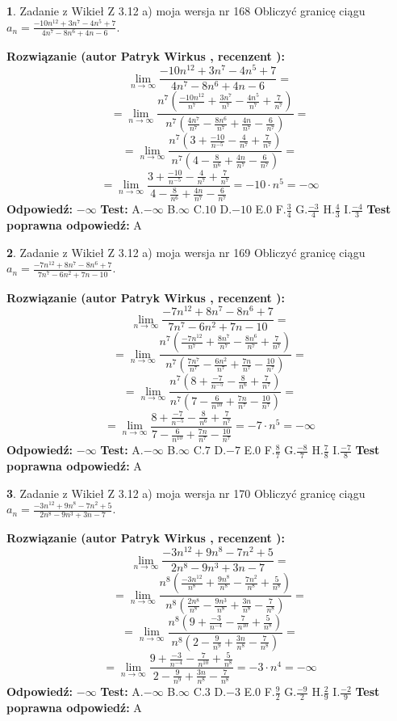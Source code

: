 \documentclass[12pt, a4paper]{article}
\theoremstyle{definition} %
\newtheorem{zad}{}
\newcommand{\zadStart}[1]{\begin{zad}#1\newline}
\newcommand{\zadStop}{\end{zad}}
\newcommand{\rozwStart}[2]{\noindent \textbf{Rozwiązanie (autor #1 , recenzent #2): }\newline}
\newcommand{\rozwStop}{\newline}
\newcommand{\odpStart}{\noindent \textbf{Odpowiedź:}\newline}
\newcommand{\odpStop}{\newline}
\newcommand{\testStart}{\noindent \textbf{Test:}\newline}
\newcommand{\testStop}{\newline}
\newcommand{\kluczStart}{\noindent \textbf{Test poprawna odpowiedź:}\newline}
\newcommand{\kluczStop}{\newline}
\begin{document}
\zadStart{Zadanie z Wikieł Z 3.12 a) moja wersja nr 168}
Obliczyć granicę ciągu $a_{n}=\frac{-10n^{12}+3n^{7}-4n^{5}+7}{4n^{7}-8n^{6}+4n-6}$.
\zadStop
\rozwStart{Patryk Wirkus}{}
$$\lim\limits_{n\to\infty}\frac{-10n^{12}+3n^{7}-4n^{5}+7}{4n^{7}-8n^{6}+4n-6}=$$
$$=\lim\limits_{n\to\infty}\frac{n^{7}\left(\frac{-10n^{12}}{n^{7}}+\frac{3n^{7}}{n^{7}}-\frac{4n^{5}}{n^{7}}+\frac{7}{n^{7}}\right)}{n^{7}\left(\frac{4n^{7}}{n^{7}}-\frac{8n^{6}}{n^{7}}+\frac{4n}{n^{7}}-\frac{6}{n^{7}}\right)}=$$
$$=\lim\limits_{n\to\infty}\frac{n^{7}\left(3+\frac{-10}{n^{-5}}-\frac{4}{n^{7}}+\frac{7}{n^{7}}\right)}
{n^{7}\left(4-\frac{8}{n^{6}}+\frac{4n}{n^{7}}-\frac{6}{n^{7}}\right)}=$$
$$=\lim\limits_{n\to\infty}\frac{3+\frac{-10}{n^{-5}}-\frac{4}{n^{7}}+\frac{7}{n^{7}}}{4-\frac{8}{n^{6}}+\frac{4n}{n^{7}}-\frac{6}{n^{7}}}=-10\cdot n^{5} = -\infty$$
\rozwStop
\odpStart
$-\infty$
\odpStop
\testStart
A.$-\infty$
B.$\infty$
C.$10$
D.$-10$
E.$0$
F.$\frac{3}{4}$
G.$\frac{-3}{4}$
H.$\frac{4}{3}$
I.$\frac{-4}{3}$
\testStop
\kluczStart
A
\kluczStop



\zadStart{Zadanie z Wikieł Z 3.12 a) moja wersja nr 169}
Obliczyć granicę ciągu $a_{n}=\frac{-7n^{12}+8n^{7}-8n^{6}+7}{7n^{7}-6n^{2}+7n-10}$.
\zadStop
\rozwStart{Patryk Wirkus}{}
$$\lim\limits_{n\to\infty}\frac{-7n^{12}+8n^{7}-8n^{6}+7}{7n^{7}-6n^{2}+7n-10}=$$
$$=\lim\limits_{n\to\infty}\frac{n^{7}\left(\frac{-7n^{12}}{n^{7}}+\frac{8n^{7}}{n^{7}}-\frac{8n^{6}}{n^{7}}+\frac{7}{n^{7}}\right)}{n^{7}\left(\frac{7n^{7}}{n^{7}}-\frac{6n^{2}}{n^{7}}+\frac{7n}{n^{7}}-\frac{10}{n^{7}}\right)}=$$
$$=\lim\limits_{n\to\infty}\frac{n^{7}\left(8+\frac{-7}{n^{-5}}-\frac{8}{n^{6}}+\frac{7}{n^{7}}\right)}
{n^{7}\left(7-\frac{6}{n^{10}}+\frac{7n}{n^{7}}-\frac{10}{n^{7}}\right)}=$$
$$=\lim\limits_{n\to\infty}\frac{8+\frac{-7}{n^{-5}}-\frac{8}{n^{6}}+\frac{7}{n^{7}}}{7-\frac{6}{n^{10}}+\frac{7n}{n^{7}}-\frac{10}{n^{7}}}=-7\cdot n^{5} = -\infty$$
\rozwStop
\odpStart
$-\infty$
\odpStop
\testStart
A.$-\infty$
B.$\infty$
C.$7$
D.$-7$
E.$0$
F.$\frac{8}{7}$
G.$\frac{-8}{7}$
H.$\frac{7}{8}$
I.$\frac{-7}{8}$
\testStop
\kluczStart
A
\kluczStop



\zadStart{Zadanie z Wikieł Z 3.12 a) moja wersja nr 170}
Obliczyć granicę ciągu $a_{n}=\frac{-3n^{12}+9n^{8}-7n^{2}+5}{2n^{8}-9n^{3}+3n-7}$.
\zadStop
\rozwStart{Patryk Wirkus}{}
$$\lim\limits_{n\to\infty}\frac{-3n^{12}+9n^{8}-7n^{2}+5}{2n^{8}-9n^{3}+3n-7}=$$
$$=\lim\limits_{n\to\infty}\frac{n^{8}\left(\frac{-3n^{12}}{n^{8}}+\frac{9n^{8}}{n^{8}}-\frac{7n^{2}}{n^{8}}+\frac{5}{n^{8}}\right)}{n^{8}\left(\frac{2n^{8}}{n^{8}}-\frac{9n^{3}}{n^{8}}+\frac{3n}{n^{8}}-\frac{7}{n^{8}}\right)}=$$
$$=\lim\limits_{n\to\infty}\frac{n^{8}\left(9+\frac{-3}{n^{-4}}-\frac{7}{n^{10}}+\frac{5}{n^{8}}\right)}
{n^{8}\left(2-\frac{9}{n^{9}}+\frac{3n}{n^{8}}-\frac{7}{n^{8}}\right)}=$$
$$=\lim\limits_{n\to\infty}\frac{9+\frac{-3}{n^{-4}}-\frac{7}{n^{10}}+\frac{5}{n^{8}}}{2-\frac{9}{n^{9}}+\frac{3n}{n^{8}}-\frac{7}{n^{8}}}=-3\cdot n^{4} = -\infty$$
\rozwStop
\odpStart
$-\infty$
\odpStop
\testStart
A.$-\infty$
B.$\infty$
C.$3$
D.$-3$
E.$0$
F.$\frac{9}{2}$
G.$\frac{-9}{2}$
H.$\frac{2}{9}$
I.$\frac{-2}{9}$
\testStop
\kluczStart
A
\kluczStop
\end{document}
